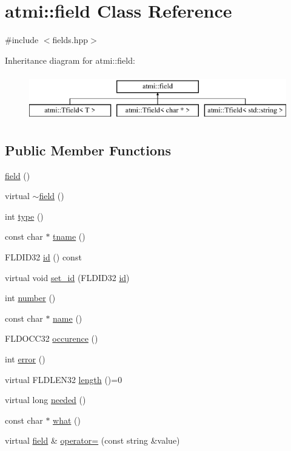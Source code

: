 \hypertarget{classatmi_1_1field}{\section{atmi\+:\+:field Class Reference}
\label{classatmi_1_1field}
}


{\ttfamily \#include $<$fields.\+hpp$>$}

Inheritance diagram for atmi\+:\+:field\+:\begin{figure}[H]
\begin{center}
\leavevmode
\includegraphics[height=2.000000cm]{classatmi_1_1field}
\end{center}
\end{figure}
\subsection*{Public Member Functions}
\begin{DoxyCompactItemize}
\item 
\hyperlink{classatmi_1_1field_ad704c8d557c86b84b2d37bdf2cbdc36c}{field} ()
\item 
virtual \hyperlink{classatmi_1_1field_a6f91cba3fca0a77fb7ad229187d689b9}{$\sim$field} ()
\item 
int \hyperlink{classatmi_1_1field_a717c701f07a784f471abb44d7bc95048}{type} ()
\item 
const char $\ast$ \hyperlink{classatmi_1_1field_a7d6260dd6f7c3c44de29190c2dfd546e}{tname} ()
\item 
F\+L\+D\+I\+D32 \hyperlink{classatmi_1_1field_a89ff294c8276c6a882f510a8f95ac372}{id} () const 
\item 
virtual void \hyperlink{classatmi_1_1field_a1d95c3b0f4ae491037ef51b8586a0083}{set\+\_\+id} (F\+L\+D\+I\+D32 \hyperlink{classatmi_1_1field_a89ff294c8276c6a882f510a8f95ac372}{id})
\item 
int \hyperlink{classatmi_1_1field_aa71d28f3df8490e9ed016607f857fae1}{number} ()
\item 
const char $\ast$ \hyperlink{classatmi_1_1field_a0fbc5a958a0af8286e339b088ee69bc8}{name} ()
\item 
F\+L\+D\+O\+C\+C32 \hyperlink{classatmi_1_1field_a161b9b7037c49fbcf86518fcb35e779c}{occurence} ()
\item 
int \hyperlink{classatmi_1_1field_a6d8db988f58f3779b0ef528a11b3466f}{error} ()
\item 
virtual F\+L\+D\+L\+E\+N32 \hyperlink{classatmi_1_1field_a296771293135085d91aa9aefd108d44d}{length} ()=0
\item 
virtual long \hyperlink{classatmi_1_1field_aef2940ef13d554b2a0090ea4052529d8}{needed} ()
\item 
const char $\ast$ \hyperlink{classatmi_1_1field_a396b41ad5ae2b1df362e446c5f090640}{what} ()
\item 
virtual \hyperlink{classatmi_1_1field}{field} \& \hyperlink{classatmi_1_1field_ac032afae0c1ebfc606f047ce1a32ac58}{operator=} (const string \&value)
\end{DoxyCompactItemize}
